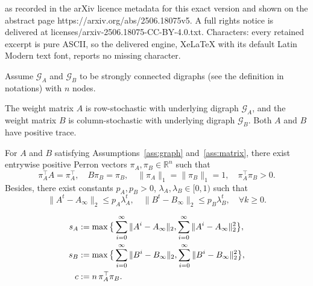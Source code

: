 \documentclass[10pt,a4paper]{amsart}
\newcommand{\cG}{{\mathcal{G}}}
\newcommand{\norm}[1]{\| #1 \|}
\begin{document}
as recorded in the arXiv licence metadata for this exact version and shown on the abstract page https://arxiv.org/abs/2506.18075v5. A full rights notice is delivered at licenses/arxiv-2506.18075-CC-BY-4.0.txt. Characters: every retained excerpt is pure ASCII, so the delivered engine, XeLaTeX with its default Latin Modern text font, reports no missing character.
\begin{assumption}\label{ass:graph}
     Assume $\cG_A$ and $\cG_B$ to be strongly connected digraphs (see the definition in notations) with $n$ nodes.
\end{assumption}

\begin{assumption}\label{ass:matrix}
    The weight matrix \(A\) is row-stochastic with underlying digraph \(\mathcal{G}_A\), and the weight matrix \(B\) is column-stochastic with underlying digraph \(\mathcal{G}_B\). Both \(A\) and \(B\) have positive trace.
\end{assumption}

\begin{proposition}\label{prop:perron}
For \(A\) and \(B\) satisfying Assumptions~\ref{ass:graph} and~\ref{ass:matrix}, there exist entrywise positive Perron vectors \(\pi_A, \pi_B \in \mathbb{R}^n\) such that
\[
\pi_A^\top A = \pi_A^\top, \quad B \pi_B = \pi_B, \quad \norm{\pi_A}_1=\norm{\pi_B}_1= 1, \quad \pi_A^\top\pi_B >0.
\]
Besides, there exist constants $p_A, p_B>0$, $\lambda_A,\lambda_B\in [0,1)$ such that 
\begin{equation}\label{eq:exp decay}
    \norm{A^t-A_\infty}_2\le p_A\lambda_A^t,\quad\norm{B^t-B_\infty}_2\le p_B\lambda_B^t,\quad \forall k\ge 0.
\end{equation}

\end{proposition}

\begin{align}
    s_A &:= \max\big\{\sum_{i=0}^\infty \norm{A^i - A_\infty}_2, \sum_{i=0}^\infty \norm{A^i - A_\infty}_2^2\big\},\label{eq:s_A definition}\\
    s_B &:= \max\big\{\sum_{i=0}^\infty \norm{B^i - B_\infty}_2,\sum_{i=0}^\infty \norm{B^i - B_\infty}_2^2\big\},\label{eq:s_B definition} \vspace{2mm}\\ 
    c &:= n\, \pi_A^\top \pi_B.\label{eq:c definition}
\end{align}
\end{document}
